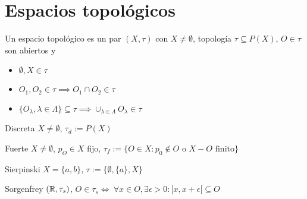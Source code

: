 \section{Espacios topológicos}
Un espacio topológico es un par $(X,\tau)$ con $X\not =\emptyset$, topología $\tau\subseteq P(X)$, $O\in\tau$ son abiertos y
\begin{itemize}
	\item $\emptyset,X\in\tau$
	\item $O_1,O_2\in\tau \implies O_1\cap O_2\in\tau$
	\item $\{O_{\lambda}, \lambda\in\Lambda\} \subseteq\tau \implies \cup_{\lambda\in\Lambda} O_{\lambda}\in\tau$	
\end{itemize}
\begin{center}
Discreta $X\not =\emptyset$, $\tau_d :=P(X)\hspace{1cm}$

Fuerte $X\not =\emptyset$, $p_O\in X$ fijo, 
$\tau_f:= \{O\in X : p_0\not\in O\text{ o } X-O \text{ finito} \}$

Sierpinski $X=\{a,b\}$, $\tau := \{\emptyset,\{a\},X\} \hspace{1cm}$

Sorgenfrey $(\mathbb{R},\tau_s)$, $O\in\tau_s \Longleftrightarrow \ \forall x\in O, \exists\epsilon>0 : [x,x+\epsilon[ \subseteq O$
\end{center}
